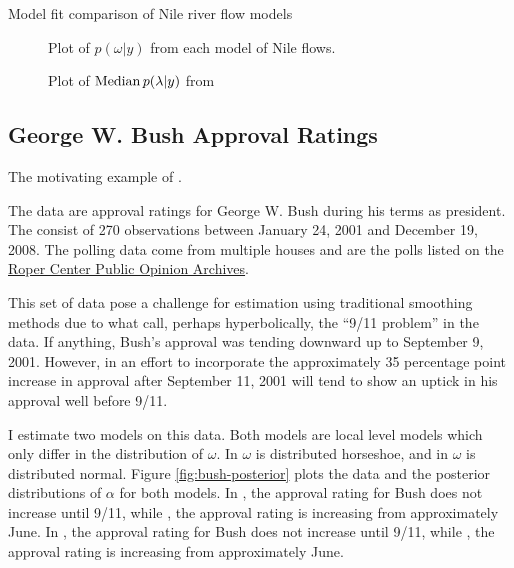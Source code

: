 \documentclass{article}
\begin{document}
\begin{table}[htpb]
  \centering
  
  \caption{Model fit comparison of Nile river flow models}
  \label{tab:nile-fits}
\end{table}

\begin{figure}[htpb]
  \centering
  \caption{Plot of $p(\omega | y)$ from each model of Nile flows.}
  \label{fig:nile-omega}
\end{figure}

\begin{figure}[htpb]
  \centering
  \caption{Plot of $\operatorname{Median} p(\lambda | y)$ from }
  \label{fig:nile-lambda}
\end{figure}

\clearpage{}

\subsection{George W. Bush Approval Ratings}
\label{sec:george-w.-bush}

The motivating example of \textcite{RatkovicEng2010}.

The data are approval ratings for George W. Bush during his terms as president.
The consist of 270 observations between January 24, 2001 and December 19, 2008.%
The polling data come from multiple houses and are the polls listed on the \href{http://webapps.ropercenter.uconn.edu/CFIDE/roper/presidential/webroot/presidential_rating_domegail.cfm?allRate=True&presidentName=Bush#.UbeB8HUbyv8}{Roper Center Public Opinion Archives}.

This set of data pose a challenge for estimation using traditional smoothing methods due to what \textcite{RatkovicEng2010} call, perhaps hyperbolically, the ``9/11 problem'' in the data.
If anything, Bush's approval was tending downward up to September 9, 2001.
However, in an effort to incorporate the approximately 35 percentage point increase in approval after September 11, 2001 will tend to show an uptick in his approval well before 9/11.

I estimate two models on this data. 
Both models are local level models which only differ in the distribution of $\omega$.
In  $\omega$ is distributed horseshoe, and in  $\omega$ is distributed normal.
Figure \ref{fig:bush-posterior} plots the data and the posterior distributions of $\alpha$ for both models.
In , the approval rating for Bush does not increase until 9/11, while , the approval rating is increasing from approximately June.
In , the approval rating for Bush does not increase until 9/11, while , the approval rating is increasing from approximately June.
\end{document}
